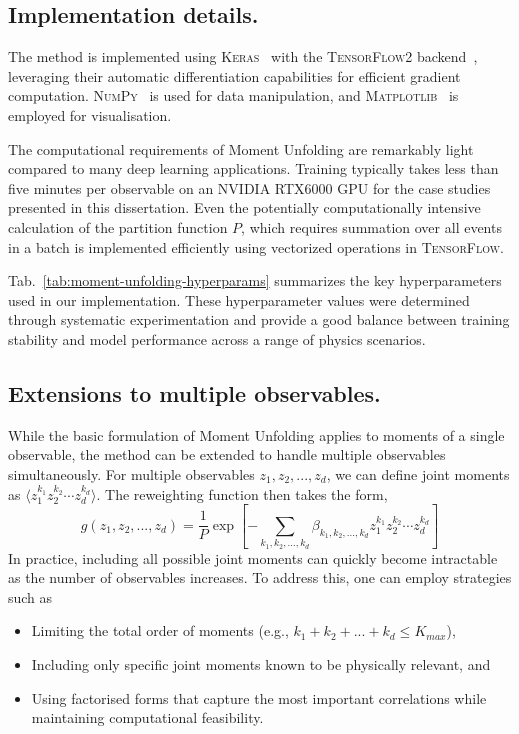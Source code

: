     \subsection{Implementation details.}
        The method is implemented using \textsc{Keras}~\cite{chollet2015keras} with the \textsc{TensorFlow2} backend~\cite{Abadi2016TensorFlow:Learning}, leveraging their automatic differentiation capabilities for efficient gradient computation.
        \textsc{NumPy}~\cite{Harris2020ArrayNumPy} is used for data manipulation, and \textsc{Matplotlib}~\cite{Hunter2007Matplotlib:Environment} is employed for visualisation.

        The computational requirements of Moment Unfolding are remarkably light compared to many deep learning applications.
        Training typically takes less than five minutes per observable on an NVIDIA RTX6000 GPU for the case studies presented in this dissertation.
       Even the potentially computationally intensive calculation of the partition function $P$, which requires summation over all events in a batch is implemented efficiently using vectorized operations in \textsc{TensorFlow}.

        Tab.~\ref{tab:moment-unfolding-hyperparams} summarizes the key hyperparameters used in our implementation.
        These hyperparameter values were determined through systematic experimentation and provide a good balance between training stability and model performance across a range of physics scenarios.



    \subsection{Extensions to multiple observables.}
        While the basic formulation of Moment Unfolding applies to moments of a single observable, the method can be extended to handle multiple observables simultaneously.
        For multiple observables $z_1, z_2, ..., z_d$, we can define joint moments as \(\langle z_1^{k_1} z_2^{k_2} \cdots z_d^{k_d} \rangle.\)
        The reweighting function then takes the form,
        \[
            g(z_1, z_2, ..., z_d) = \frac{1}{P}\exp\left[-\sum_{k_1, k_2, ..., k_d} \beta_{k_1, k_2, ..., k_d} z_1^{k_1} z_2^{k_2} \cdots z_d^{k_d}\right]
        \]
        In practice, including all possible joint moments can quickly become intractable as the number of observables increases.
        To address this, one can employ strategies such as
        \begin{itemize}
            \item Limiting the total order of moments (e.g., $k_1 + k_2 + ... + k_d \leq K_{max}$),
            \item Including only specific joint moments known to be physically relevant, and
            \item Using factorised forms that capture the most important correlations while maintaining computational feasibility.
        \end{itemize}
